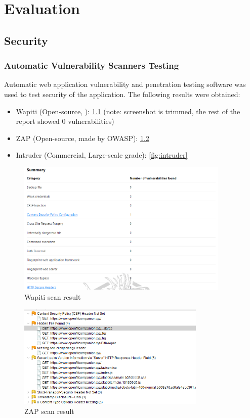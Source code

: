 \chapter{Evaluation}
\label{cha:evaluation}
\section{Security}
\subsection{Automatic Vulnerability Scanners Testing}
Automatic web application vulnerability and penetration testing software was used to test security of the application. The following results were obtained: 
\begin{itemize}
    \item Wapiti (Open-source, ): \ref{fig:wapiti} (note: screenshot is trimmed, the rest of the report showed 0 vulnerabilities)
    \item ZAP (Open-source, made by OWASP): \ref{fig:zap}
    \item Intruder (Commercial, Large-scale grade): \ref{fig:intruder}
\end{itemize}
\begin{figure}
    
    \centering
    \includegraphics[width=0.9\textwidth,keepaspectratio]{../images/Wapiti.png}
    \caption{Wapiti scan result}
    \label{fig:wapiti}
    
\end{figure}
\begin{figure}
    
    \centering
    \includegraphics[width=0.8\textwidth,keepaspectratio]{../images/ZapResults.png}
    \caption{ZAP scan result}
    \label{fig:zap}
    
\end{figure}
